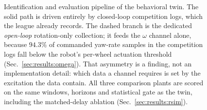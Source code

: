 \begin{figure}[!t]
\caption{Identification and evaluation pipeline of the behavioral twin.
The solid path is driven entirely by closed-loop competition logs, which the
league already records. The dashed branch is the dedicated \emph{open-loop}
rotation-only collection; it feeds the $\omega$ channel alone, because
$94.3\%$ of commanded yaw-rate samples in the competition logs fall below the
robot's per-wheel actuation threshold (Sec.~\ref{sec:results:omega}). That
asymmetry is a finding, not an implementation detail: which data a channel
requires is set by the excitation the data contain. All three comparison
plants are scored on the same windows, horizons and statistical gate as the
twin, including the matched-delay ablation
(Sec.~\ref{sec:results:rsim}).}
\label{fig:arch}
\end{figure}
